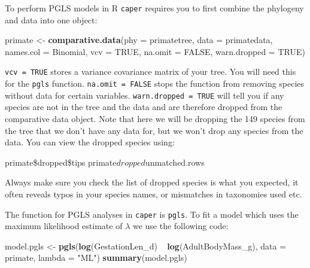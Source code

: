 \documentclass[12pt]{article}
\newcommand{\KeywordTok}[1]{\textcolor[rgb]{0.13,0.29,0.53}{\textbf{{#1}}}}
\newcommand{\DataTypeTok}[1]{\textcolor[rgb]{0.13,0.29,0.53}{{#1}}}
\newcommand{\StringTok}[1]{\textcolor[rgb]{0.31,0.60,0.02}{{#1}}}
\newcommand{\OtherTok}[1]{\textcolor[rgb]{0.56,0.35,0.01}{{#1}}}
\newcommand{\NormalTok}[1]{{#1}}
\begin{document}
To perform PGLS models in R \texttt{caper} requires you to first combine the phylogeny and data into one object:

\begin{snugshade}
\begin{Highlighting}[]
\NormalTok{primate <-}\StringTok{ }\KeywordTok{comparative.data}\NormalTok{(}\DataTypeTok{phy =} \NormalTok{primatetree, }\DataTypeTok{data =} \NormalTok{primatedata, }
                            \DataTypeTok{names.col =} \NormalTok{Binomial, }\DataTypeTok{vcv =} \OtherTok{TRUE}\NormalTok{, }
                            \DataTypeTok{na.omit =} \OtherTok{FALSE}\NormalTok{, }\DataTypeTok{warn.dropped =} \OtherTok{TRUE}\NormalTok{)}
\end{Highlighting}
\end{snugshade}

\texttt{vcv = TRUE} stores a variance covariance matrix of your tree. You will need this for the \texttt{pgls} function. \texttt{na.omit = FALSE} stops the function from removing species without data for certain variables. \texttt{warn.dropped = TRUE} will tell you if any species are not in the tree and the data and are therefore dropped from the comparative data object. Note that here we will be dropping the 149 species from the tree that we don't have any data for, but we won't drop any species from the data. You can view the dropped species using:

\begin{snugshade}
\begin{Highlighting}[]
\NormalTok{primate\$dropped\$tips}
\NormalTok{primate$dropped$unmatched.rows}
\end{Highlighting}
\end{snugshade}

\begin{framed}
Always make sure you check the list of dropped species is what you expected, it often reveals typos in your species names, or mismatches in taxonomies used etc.
\end{framed}

The function for PGLS analyses in \texttt{caper} is \texttt{pgls}. To fit a model which uses the maximum likelihood estimate of $\lambda$ we use the following code:

\begin{snugshade}
\begin{Highlighting}[]
\NormalTok{model.pgls <-}\StringTok{ }\KeywordTok{pgls}\NormalTok{(}\KeywordTok{log}\NormalTok{(GestationLen_d) ~}\StringTok{ }\KeywordTok{log}\NormalTok{(AdultBodyMass_g), }
                   \DataTypeTok{data =} \NormalTok{primate, }\DataTypeTok{lambda =} \StringTok{"ML"}\NormalTok{)}
\KeywordTok{summary}\NormalTok{(model.pgls)}
\end{Highlighting}
\end{snugshade}
\end{document}

